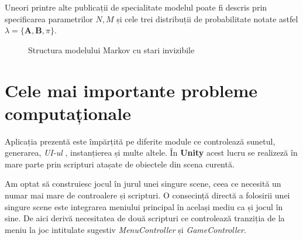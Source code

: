 Uneori printre alte publicații de specialitate modelul poate fi descris prin specificarea parametrilor $N,M$ și cele trei distribuții de probabilitate notate astfel $\lambda = \{\textbf{A},\textbf{B},\pi\}$.\par
\vspace{10mm}
\begin{figure}[H]
\centering
{}
\caption{Structura modelului Markov cu stari invizibile}
\end{figure}


\section{Cele mai importante probleme computaționale }
Aplicația prezentă este împărțită pe diferite module ce controlează sunetul, generarea, \textit{UI-ul} , instanțierea și multe altele. În \textbf{Unity} acest lucru se realizeză în mare parte prin scripturi atașate de obiectele din scena curentă. \par
Am optat să construiesc jocul în jurul unei singure scene, ceea ce necesită un numar mai mare de controalere și scripturi. O consecință directă a folosirii unei singure scene este integrarea meniului principal în același mediu ca și jocul în sine. De aici derivă necesitatea de două scripturi ce controlează tranziția de la meniu la joc intitulate sugestiv \textit{MenuController} și \textit{GameController}.\par

